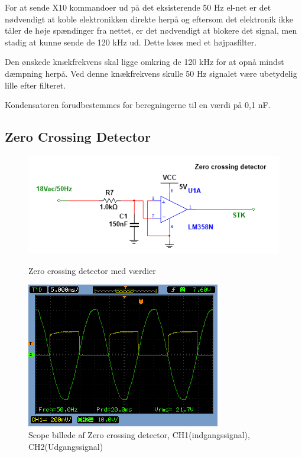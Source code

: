 For at sende X10 kommandoer ud på det eksisterende 50 Hz el-net er det nødvendigt at koble elektronikken direkte herpå og eftersom det elektronik ikke tåler de høje spændinger fra nettet, er det nødvendigt at blokere det signal, men stadig at kunne sende de 120 kHz ud. Dette løses med et højpasfilter.

Den ønskede knækfrekvens skal ligge omkring de 120 kHz for at opnå mindst dæmpning herpå. Ved denne knækfrekvens skulle 50 Hz signalet være ubetydelig lille efter filteret. 

Kondensatoren forudbestemmes for beregningerne til en værdi på 0,1 nF.


\newpage
  
\subsection{Zero Crossing Detector}
\begin{figure}[htb]
  \begin{minipage}{0.45\textwidth}
    \centering
      \includegraphics[width=\textwidth]{billeder/HWdesign/ZC_MV}
      \caption{Zero crossing detector med værdier}
    \label{fig:ZC_MV}
  \end{minipage}
  \hspace{0.1\textwidth}
  \begin{minipage}{0.45\textwidth}
    \centering
      \includegraphics[width=\textwidth]{billeder/HWTest/Encoder/Encoder_zerocross}
      \caption{Scope billede af Zero crossing detector, CH1(indgangssignal), CH2(Udgangssignal)}
    \label{fig:Encoder_Zerocross}
  \end{minipage}
\end{figure}


